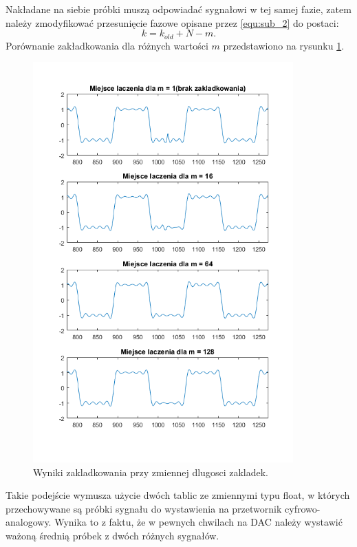 Nakładane na siebie próbki muszą odpowiadać sygnałowi w tej samej fazie, zatem należy zmodyfikować przesunięcie fazowe opisane przez \ref{equ:sub_2} do postaci:
\begin{equation} \label{equ:sub_4}
k = k_{old} + N - m.
\end{equation}
Porównanie zakładkowania dla różnych wartości $m$ przedstawiono na rysunku  \ref{rys:sub_overlaps}.
\begin{figure}[H]
	\centering
	\includegraphics[width=10cm]{grafiki/sub_overlaps}
	\captionsetup{justification=centering}
	\caption{Wyniki zakladkowania przy zmiennej dlugosci zakladek.}
	\label{rys:sub_overlaps}
\end{figure}

Takie podejście wymusza użycie dwóch tablic ze zmiennymi typu float, w których przechowywane są próbki sygnału do wystawienia na przetwornik cyfrowo-analogowy. Wynika to z faktu, że w pewnych chwilach na DAC należy wystawić ważoną średnią próbek z dwóch różnych sygnałów. 

